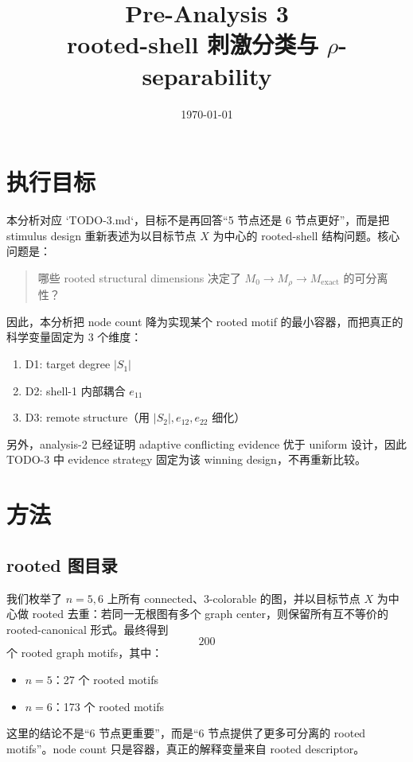 \documentclass[11pt,a4paper]{ctexart}
\title{Pre-Analysis 3\\[4pt]
\large rooted-shell 刺激分类与 \texorpdfstring{$\rho$}{rho}-separability}
\author{}
\date{\today}
\begin{document}
\maketitle

\tableofcontents
\bigskip

\section{执行目标}

本分析对应 `TODO-3.md`，目标不是再回答“5 节点还是 6 节点更好”，而是把 stimulus design 重新表述为以目标节点 $X$ 为中心的 rooted-shell 结构问题。核心问题是：
\begin{quote}
哪些 rooted structural dimensions 决定了 $M_0 \rightarrow M_\rho \rightarrow M_\mathrm{exact}$ 的可分离性？
\end{quote}

因此，本分析把 node count 降为实现某个 rooted motif 的最小容器，而把真正的科学变量固定为 3 个维度：
\begin{enumerate}
    \item D1: target degree $|S_1|$
    \item D2: shell-1 内部耦合 $e_{11}$
    \item D3: remote structure（用 $|S_2|, e_{12}, e_{22}$ 细化）
\end{enumerate}

另外，analysis-2 已经证明 adaptive conflicting evidence 优于 uniform 设计，因此 TODO-3 中 evidence strategy 固定为该 winning design，不再重新比较。

\section{方法}

\subsection{rooted 图目录}

我们枚举了 $n=5,6$ 上所有 connected、3-colorable 的图，并以目标节点 $X$ 为中心做 rooted 去重：若同一无根图有多个 graph center，则保留所有互不等价的 rooted-canonical 形式。最终得到
\[
200
\]
个 rooted graph motifs，其中：
\begin{itemize}
    \item $n=5$：27 个 rooted motifs
    \item $n=6$：173 个 rooted motifs
\end{itemize}

这里的结论不是“6 节点更重要”，而是“6 节点提供了更多可分离的 rooted motifs”。node count 只是容器，真正的解释变量来自 rooted descriptor。
\end{document}
